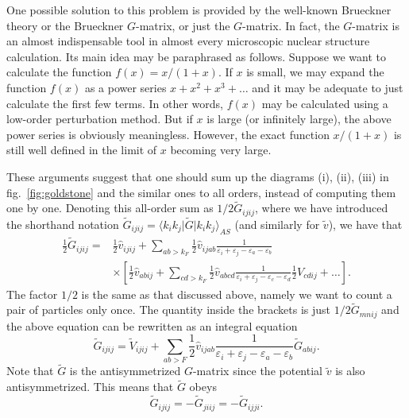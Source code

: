 One possible solution to  this problem is provided by the well-known
Brueckner theory or the Brueckner $G$-matrix, or just the
$G$-matrix. In fact, the $G$-matrix is an almost indispensable
tool in almost every microscopic nuclear structure
calculation. Its main idea may be paraphrased as follows.
Suppose we want to calculate the function $f(x)=x/(1+x)$. If
$x$ is small, we may expand the function $f(x)$ as a power series
$x+x^2+x^3+\dots$ and it may be adequate to just calculate the first
few terms. In other words, $f(x)$ may be calculated using a low-order
perturbation method. But if $x$ is large
(or infinitely large), the above
power series is obviously meaningless.
However, the exact function
$x/(1+x)$ is still well defined in the limit
of $x$ becoming very large.

These arguments suggest that one should sum up the diagrams
(i), (ii), (iii) in fig.~\ref{fig:goldstone} and the similar ones
to all orders, instead of computing them one by one. Denoting this
all-order sum as $1/2\tilde{G}_{ijij}$, where we have
introduced the shorthand notation
$\tilde{G}_{ijij}=\langle k_ik_j\vert \tilde{G}\vert k_ik_j\rangle_{AS}$
(and similarly for $\tilde{v}$),
we have that
\begin{align}
      \frac{1}{2}\tilde{G}_{ijij}=&\frac{1}{2}\hat{v}_{ijij}
      +\sum_{ab>k_F}\frac{1}{2}\hat{v}_{ijab}\frac{1}{\varepsilon_i+\varepsilon_j-\varepsilon_a-\varepsilon_b}
      \nonumber \\
      & \times\left[\frac{1}{2}\hat{v}_{abij}+\sum_{cd>k_F}
      \frac{1}{2}\hat{v}_{abcd}\frac{1}
      {\varepsilon_i+\varepsilon_j-\varepsilon_c-\varepsilon_d}
      \frac{1}{2}V_{cdij}+\dots  \right].
\end{align}
The factor $1/2$ is the same as that discussed above, namely we want 
to count a pair of particles only once.
The quantity inside the brackets is just
$1/2\tilde{G}_{mnij}$ and the above equation can be
rewritten as an integral equation
\begin{equation}
      \tilde{G}_{ijij}=\tilde{V}_{ijij}
      +\sum_{ab>F}\frac{1}{2}\hat{v}_{ijab}\frac{1}{\varepsilon_i+\varepsilon_j-\varepsilon_a-\varepsilon_b}
      \tilde{G}_{abij}.
\end{equation}
Note that $\tilde{G}$ is the antisymmetrized $G$-matrix since
the potential $\tilde{v}$ is also antisymmetrized. This means that
$\tilde{G}$ obeys
\begin{equation}
  \tilde{G}_{ijij}=-\tilde{G}_{jiij}=-\tilde{G}_{ijji}.
\end{equation}
